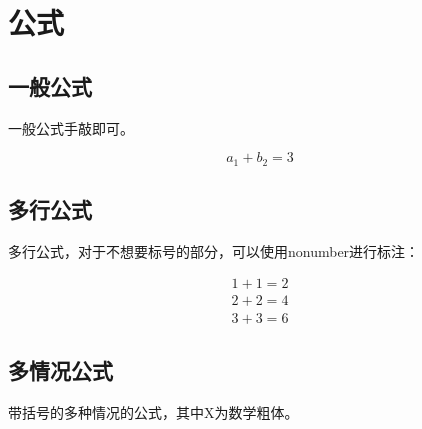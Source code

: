 \documentclass[AutoFakeBold]{LZUThesis-PgD&PhD}
\begin{document}
\section{公式}

\subsection{一般公式}

一般公式手敲即可。



\begin{equation}\label{eq:sip}
  a_1 + b_2 = 3
\end{equation}


\subsection{多行公式}

多行公式，对于不想要标号的部分，可以使用nonumber进行标注：


\begin{gather}\label{eq:add}
1+1=2 \\
2+2=4 \\
3+3=6 \nonumber
\end{gather}

\subsection{多情况公式}
带括号的多种情况的公式，其中X为数学粗体。

\end{document}
